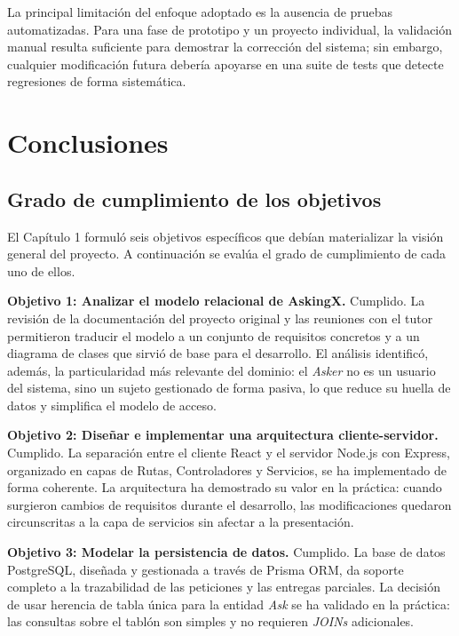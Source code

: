 \documentclass[11pt,oneside,spanish,listoffigures,listoftables]{tfgetsinf}
\begin{document}
La principal limitación del enfoque adoptado es la ausencia de pruebas automatizadas. Para una fase de prototipo y un proyecto individual, la validación manual resulta suficiente para demostrar la corrección del sistema; sin embargo, cualquier modificación futura debería apoyarse en una suite de tests que detecte regresiones de forma sistemática.

\chapter{Conclusiones}

\section{Grado de cumplimiento de los objetivos}

El Capítulo 1 formuló seis objetivos específicos que debían materializar la visión general del proyecto. A continuación se evalúa el grado de cumplimiento de cada uno de ellos.

\textbf{Objetivo 1: Analizar el modelo relacional de AskingX.} Cumplido. La revisión de la documentación del proyecto original y las reuniones con el tutor permitieron traducir el modelo a un conjunto de requisitos concretos y a un diagrama de clases que sirvió de base para el desarrollo. El análisis identificó, además, la particularidad más relevante del dominio: el \textit{Asker} no es un usuario del sistema, sino un sujeto gestionado de forma pasiva, lo que reduce su huella de datos y simplifica el modelo de acceso.

\textbf{Objetivo 2: Diseñar e implementar una arquitectura cliente-servidor.} Cumplido. La separación entre el cliente React y el servidor Node.js con Express, organizado en capas de Rutas, Controladores y Servicios, se ha implementado de forma coherente. La arquitectura ha demostrado su valor en la práctica: cuando surgieron cambios de requisitos durante el desarrollo, las modificaciones quedaron circunscritas a la capa de servicios sin afectar a la presentación.

\textbf{Objetivo 3: Modelar la persistencia de datos.} Cumplido. La base de datos PostgreSQL, diseñada y gestionada a través de Prisma ORM, da soporte completo a la trazabilidad de las peticiones y las entregas parciales. La decisión de usar herencia de tabla única para la entidad \textit{Ask} se ha validado en la práctica: las consultas sobre el tablón son simples y no requieren \textit{JOINs} adicionales.
\end{document}
